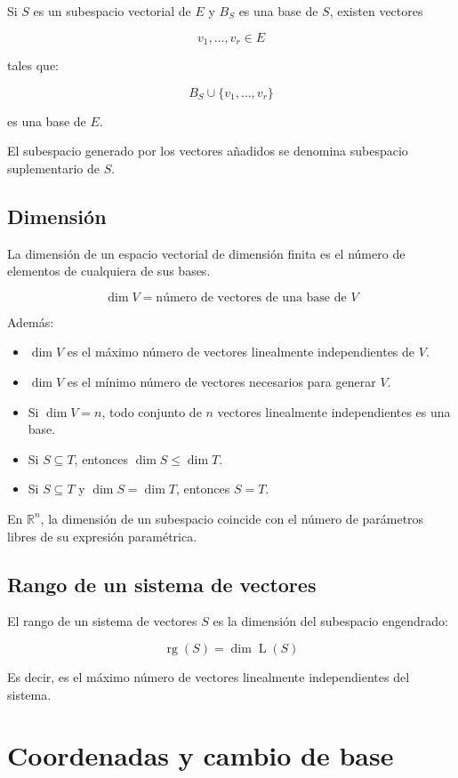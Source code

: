 \documentclass[11pt,a4paper]{article}
\newcommand{\R}{\mathbb{R}}
\newcommand{\Span}{\operatorname{L}}
\newcommand{\rg}{\operatorname{rg}}
\newcommand{\dimn}{\operatorname{dim}}
\begin{document}
Si $S$ es un subespacio vectorial de $E$ y $B_S$ es una base de $S$, existen vectores

\[
v_1,\ldots,v_r\in E
\]

tales que:

\[
B_S\cup\{v_1,\ldots,v_r\}
\]

es una base de $E$.

El subespacio generado por los vectores añadidos se denomina subespacio suplementario de $S$.

\subsection{Dimensión}

La dimensión de un espacio vectorial de dimensión finita es el número de elementos de cualquiera de sus bases.

\[
\boxed{
\dimn V
=
\text{número de vectores de una base de }V
}
\]

Además:

\begin{itemize}
	\item $\dimn V$ es el máximo número de vectores linealmente independientes de $V$.
	\item $\dimn V$ es el mínimo número de vectores necesarios para generar $V$.
	\item Si $\dimn V=n$, todo conjunto de $n$ vectores linealmente independientes es una base.
	\item Si $S\subseteq T$, entonces $\dimn S\leq\dimn T$.
	\item Si $S\subseteq T$ y $\dimn S=\dimn T$, entonces $S=T$.
\end{itemize}

En $\R^n$, la dimensión de un subespacio coincide con el número de parámetros libres de su expresión paramétrica.

\subsection{Rango de un sistema de vectores}

El rango de un sistema de vectores $S$ es la dimensión del subespacio engendrado:

\[
\boxed{
\rg(S)=\dimn\Span(S)
}
\]

Es decir, es el máximo número de vectores linealmente independientes del sistema.

\section{Coordenadas y cambio de base}
\end{document}
